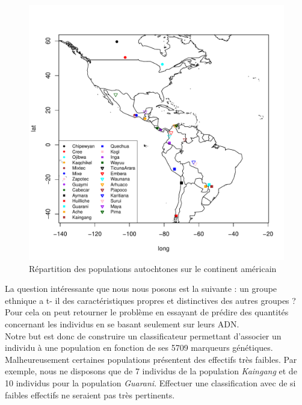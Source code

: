 \documentclass[12pt,a4paper]{article}
\begin{document}
\begin{figure}[h!]
	\begin{center}
		\includegraphics[scale=0.8]{figures/map.pdf}
		\caption{Répartition des populations autochtones sur le continent américain}
		\label{fig:map}
	\end{center}
\end{figure}
La question intéressante que nous nous posons est la suivante : un groupe ethnique a t- il des caractéristiques propres et distinctives des autres groupes ? Pour cela on peut
retourner le problème en essayant de prédire des quantités concernant les individus
en se basant seulement sur leurs ADN. \vspace{2mm}\\
Notre but est donc de construire un classificateur permettant d'associer un individu
à une population en fonction de ses 5709 marqueurs génétiques. Malheureusement
certaines populations présentent des effectifs très faibles. Par exemple, nous
ne disposons que de 7 individus de la population \textit{Kaingang} et de 10
individus pour la population \textit{Guarani}. Effectuer une classification
avec de si faibles effectifs ne seraient pas très pertinents.\vspace{2mm}
\end{document}
